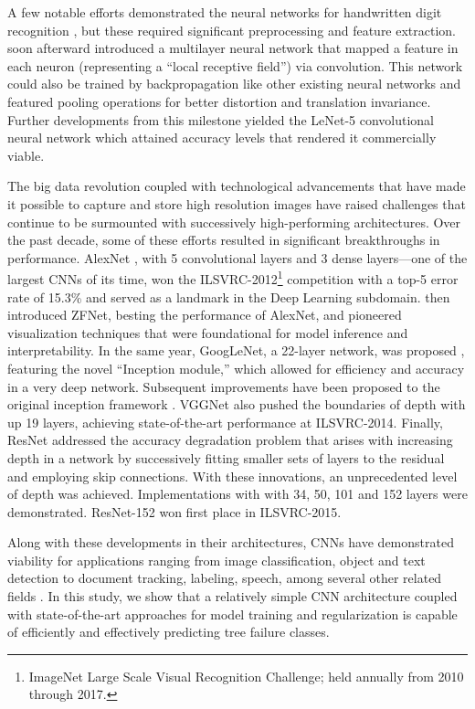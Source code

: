\documentclass[Journal,letterpaper, SingleSpace, InsideFigs]{ascelike-new}
\begin{document}
A few notable efforts demonstrated the neural networks for handwritten digit recognition
\cite{fukushima1988neocognitron,denker1988neural}, but these required significant preprocessing and feature
extraction.  soon afterward introduced a multilayer neural network that mapped a feature in each neuron (representing a ``local receptive field'') via convolution. This network could also be trained by backpropagation like other existing neural networks and featured pooling operations for better distortion and
translation invariance. Further developments from this milestone yielded the LeNet-5 convolutional neural network which attained accuracy levels that rendered it commercially viable.

The big data revolution coupled with technological advancements that have made it possible to capture and store high resolution images have raised challenges that continue to be surmounted with successively high-performing
architectures. Over the past decade, some of these efforts resulted in significant breakthroughs in performance. AlexNet \cite{krizhevsky2012imageneta}, with 5 convolutional layers and 3 dense layers---one of the largest CNNs of its time, won the ILSVRC-2012\footnote{ImageNet Large Scale Visual Recognition Challenge; held annually from 2010 through 2017.} competition with a top-5 error rate of 15.3\% and served as a landmark in the Deep Learning subdomain.  then introduced ZFNet, besting the performance of AlexNet, and pioneered visualization techniques that were foundational for model inference and interpretability.  In the same year, GoogLeNet, a 22-layer network, was proposed \cite{szegedy2014going}, featuring the novel ``Inception module,'' which allowed for efficiency and accuracy in a very deep network. Subsequent improvements have been proposed to the original inception framework \cite{szegedy2015rethinking,szegedy2016inceptionv4}.  VGGNet \cite{simonyan2015very} also pushed the boundaries of depth with up 19 layers, achieving state-of-the-art performance at ILSVRC-2014. Finally, ResNet \cite{he2015deep} addressed the accuracy degradation problem that arises with increasing depth in a network by successively fitting smaller sets of layers to the residual and employing skip connections. With these innovations, an unprecedented level of depth was achieved. Implementations with with 34, 50, 101 and 152 layers were demonstrated. ResNet-152 won first place in ILSVRC-2015.

Along with these developments in their architectures, CNNs have demonstrated viability for applications ranging from image classification, object and text detection to document tracking, labeling, speech, among several other related
fields \cite{gu2018recent}. 
In this study, we show that a relatively simple CNN architecture coupled with state-of-the-art approaches for model training and regularization is capable of efficiently and effectively predicting tree failure classes.
\end{document}
